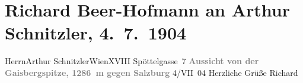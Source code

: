 

         
         \renewcommand{\erwaehntePersonen}{Personen: Richard Beer-Hofmann}
         \renewcommand{\erwaehnteOrte}{Orte: Bad Aussee, Edmund-Weiß-Gasse 7, Gaisbergspitze, Parsch, Salzburg, Wien}
         \renewcommand{\erwaehnteWerke}{}
               \section[Richard Beer-Hofmann an Arthur Schnitzler, 4. 7. 1904]{ Richard Beer-Hofmann an Arthur Schnitzler, 4. 7. 1904}\nopagebreak{}\rehead{ }\begin{ledgroupsized}[t]{13cm}\normalsize\beginnumbering \toendnotes[C]{\smallbreak\pagebreak[2]} 
\pstart{}{\pb}Herrn\pend{}\pstart{}Arthur Schnitzler\pend{}\pstart{}Wien\pend{}\pstart{}XVIII Spöttelgasse 7\pend{}{\bigskip}\pstart
           \noindent{}\centering{}{\pb}\textcolor{gray}{\textbf{Aussicht von der Gaisbergspitze, 1286 m gegen Salzburg}}\pend
           \pstart
           \raggedleft{}4/VII 04\pend
           \pstart
           Herzliche Grüße\pend
           \pstart \spacefill\mbox{Richard}\pend{}
         
         \endnumbering{}\end{ledgroupsized}  \newcommand{\dateiname}{L01415}\newcommand{\titel}{Richard Beer-Hofmann an Arthur Schnitzler, 4. 7. 1904}\newcommand{\editorInnen}{Martin Anton Müller und Gerd-Hermann Susen}
      